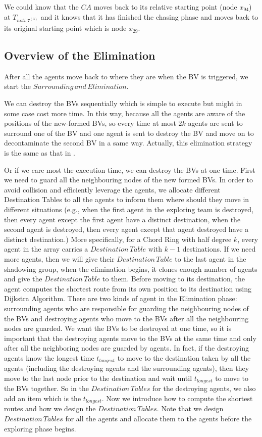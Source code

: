 We could know that the $CA$ moves back to its relative starting point (node $x_{94}$) at $T_{noti\_7^{(3)}}$ and it knows that it has finished the chasing phase and moves back to its original starting point which is node $x_{29}$.


\subsection{Overview of the Elimination}
After all the agents move back to where they are when the BV is triggered, we start the $Surrounding\,and\,Elimination$. 

We can destroy the BVs sequentially which is simple to execute but might in some case cost more time. In this way, because all the agents are aware of the positions of the new-formed BVs, so every time at most $2k$ agents are sent to surround one of the BV and one agent is sent to destroy the BV and move on to decontaminate the second BV in a same way. Actually, this elimination strategy is the same as that in \cite{Alotaibi}. 

Or if we care most the execution time, we can destroy the BVs at one time. First we need to guard all the neighbouring nodes of the new formed BVs. In order to avoid collision and efficiently leverage the agents, we allocate different Destination Tables to all the agents to inform them where should they move in different situations (e.g., when the first agent in the exploring team is destroyed, then every agent except the first agent have a distinct destination, when the second agent is destroyed, then every agent except that agent destroyed have a distinct destination.) More specifically, for a Chord Ring with half degree $k$, every agent in the array carries a $Destination\,Table$ with $k-1$ destinations. If we need more agents, then we will give their $Destination\,Table$ to the last agent in the shadowing group, when the elimination begins, it clones enough number of agents and give the $Destination\, Table$ to them. Before moving to its destination, the agent computes the shortest route from its own position to its destination using Dijkstra Algorithm. There are two kinds of agent in the Elimination phase: surrounding agents who are responsible for guarding the neighbouring nodes of the BVs and destroying agents who move to the BVs after all the neighbouring nodes are guarded. We want the BVs to be destroyed at one time, so it is important that the destroying agents move to the BVs at the same time and only after all the neighboring nodes are guarded by agents. In fact, if the destroying agents know the longest time $t_{longest}$ to move to the destination taken by all the agents (including the destroying agents and the surrounding agents), then they move to the last node prior to the destination and wait until $t_{longest}$ to move to the BVs together. So in the $Destination\,Tables$ for the destroying agents, we also add an item which is the $t_{longest}$. Now we introduce how to compute the shortest routes and how we design the $Destination\,Tables$. Note that we design $Destination\,Tables$ for all the agents and allocate them to the agents before the exploring phase begins.


